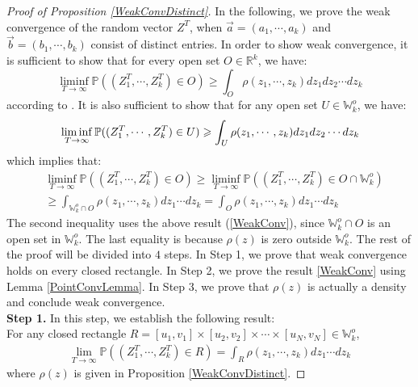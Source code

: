 \begin{proof}[Proof of Proposition \ref{WeakConvDistinct}]
In the following, we prove the weak convergence of the random vector $Z^{T}$, when $\vec{a}=(a_{1},\cdots,a_{k})$ and $\vec{b}=(b_{1},\cdots,b_{k})$ consist of distinct entries. 
In order to show weak convergence, it is sufficient to show that for every open set $O\in\mathbb{R}^{k}$, we have: 
$$\liminf_{T\rightarrow\infty}\mathbb{P}((Z_{1}^{T},\cdots,Z_{k}^{T})\in O)\geqslant\int_{O}\rho(z_{1},\cdots,z_{k})dz_{1}dz_{2}\cdots dz_{k}$$
according to \cite[Theorem 3.2.11]{Durrett}. It is also sufficient to show that for any open set $U\in\mathbb{W}_{k}^{o}$, we have:
\begin{align}{\label{WeakConv}}
	\liminf_{T\rightarrow\infty}\mathbb{P}((Z_{1}^{T},\cdots,Z_{k}^{T})\in U)\geqslant\int_{U}\rho(z_{1},\cdots,z_{k})dz_{1}dz_{2}\cdots dz_{k}
\end{align}
which implies that:
\begin{align*}
	&\liminf_{T\rightarrow\infty}\mathbb{P}((Z_{1}^{T},\cdots,Z_{k}^{T})\in O)\geqslant\liminf_{T\rightarrow\infty}\mathbb{P}((Z_{1}^{T},\cdots,Z_{k}^{T})\in O\cap\mathbb{W}_{k}^{o})\\
	&\geqslant \int_{\mathbb{W}_{k}^{o}\cap O}\rho(z_{1},\cdots,z_{k})dz_{1}\cdots dz_{k}= \int_{O}\rho(z_{1},\cdots,z_{k})dz_{1}\cdots dz_{k}
\end{align*}
The second inequality uses the above result (\ref{WeakConv}), since $\mathbb{W}_{k}^{o}\cap O$ is an open set in $\mathbb{W}_{k}^{o}$. The last equality is because $\rho(z)$ is zero outside $\mathbb{W}_{k}^{o}$. The rest of the proof will be divided into $4$ steps. In Step 1, we prove that weak convergence holds on every closed rectangle. In Step 2, we prove the result \ref{WeakConv} using Lemma \ref{PointConvLemma}. In Step 3, we prove that $\rho(z)$ is actually a density and conclude weak convergence.\\
\noindent \textbf{Step 1. }In this step, we establish the following result:\\
For any closed rectangle $R=[u_{1},v_{1}]\times [u_{2},v_{2}]\times\cdots\times[u_{N},v_{N}]\in\mathbb{W}_{k}^{o}$, 
\begin{align}
	\lim_{T\rightarrow\infty}\mathbb{P}((Z_{1}^{T},\cdots,Z_{k}^{T})\in R)=\int_{R}\rho(z_{1},\cdots,z_{k})dz_{1}\cdots dz_{k}
\end{align}
where $\rho(z)$ is given in Proposition \ref{WeakConvDistinct}.


\end{proof}

